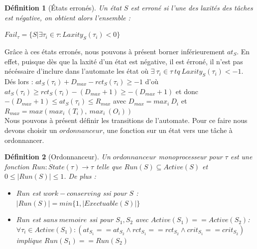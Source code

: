 \documentclass[a4paper]{report}
\theoremstyle{break}
\newtheorem{defin}{Définition}
\theoremstyle{breakplain}
\begin{document}
\begin{defin}[États erronés]
Un état $S$ est erroné si l'une des laxités des tâches est négative, on obtient alors l'ensemble :

$Fail_\tau = \{S|\exists \tau_i \in \tau : Laxity_S(\tau_i) < 0  \}$\\
\end{defin}

Grâce à ces états erronés, nous pouvons à présent borner inférieurement $at_S$. En effet, puisque dès que la laxité d'un état est négative, il est érroné, il n'est pas nécéssaire d'inclure dans l'automate les état où $\exists\ \tau_i \in \tau\ tq\ Laxity_S(\tau_i) < -1$. Dés lors : $at_S(\tau_i) + D_{max} - rct_S(\tau_i) \geq -1$ d'où $at_S(\tau_i) \geq rct_S(\tau_i) - (D_{max}+1) \geq -(D_{max}+1)$ et donc $-(D_{max}+1) \leq at_S(\tau_i) \leq R_{max}$ avec $D_{max} = max_i\ D_i$ et $R_{max} = max(max_i\ (T_i),\ max_i\ (O_i))$\\

Nous pouvons à présent définir les transitions de l'automate. Pour ce faire nous devons choisir un $ordonnanceur$, une fonction sur un état vers une tâche à ordonnancer.

\begin{defin}[Ordonnanceur]
Un $ordonnanceur$ monoprocesseur pour $\tau$ est une fonction $Run : State(\tau) \rightarrow \tau$ telle que $Run(S) \subseteq Active(S)$ et $0 \leq |Run(S)| \leq 1$.
De plus :
\begin{itemize}
\item $Run$ est $work-conserving$ ssi pour $S$ : $ |Run(S)| = min\{1, |Exectuable(S)|\}$
\item $Run$ est $sans\ memoire$ ssi pour $S_1,S_2$ avec $Active(S_1) == Active(S_2)$:
$\forall \tau_i \in Active(S_1) : (at_{S_1} == at_{S_2} \wedge rct_{S_1} == rct_{S_2} \wedge crit_{S_1} == crit_{S_2} )$ implique $Run(S_1) == Run(S_2)$
\end{itemize}

\end{defin}
\end{document}
